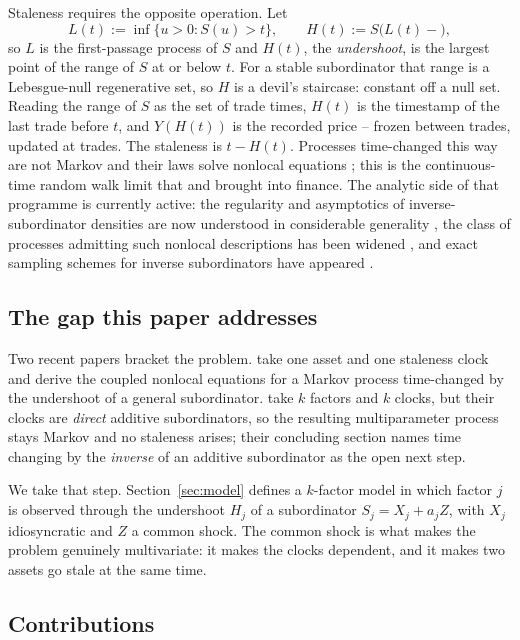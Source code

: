 \documentclass{ws-ijtaf}
\begin{document}
Staleness requires the opposite operation. Let
\begin{equation}
L(t) := \inf\{u>0 : S(u)>t\}, \qquad
H(t) := S\big(L(t)-\big),
\label{eq:LH}
\end{equation}
so $L$ is the first-passage process of $S$ and $H(t)$, the \emph{undershoot}, is
the largest point of the range of $S$ at or below $t$. For a stable subordinator
that range is a Lebesgue-null regenerative set, so $H$ is a devil's staircase:
constant off a null set. Reading the range of $S$ as the set of trade times,
$H(t)$ is the timestamp of the last trade before $t$, and $Y(H(t))$ is the
recorded price -- frozen between trades, updated at trades. The staleness is
$t-H(t)$. Processes time-changed this way are not Markov and their laws solve
nonlocal equations \citep{mee04,toa15,mee12}; this is the continuous-time random
walk limit that \citet{sca00} and \citet{mai00} brought into finance. The
analytic side of that programme is currently active: the regularity and
asymptotics of inverse-subordinator densities are now understood in
considerable generality \citep{asc24b}, the class of processes admitting such
nonlocal descriptions has been widened \citep{fac25}, and exact sampling
schemes for inverse subordinators have appeared \citep{bio26}.

\subsection{The gap this paper addresses}

Two recent papers bracket the problem. \citet{asc24} take one asset and one
staleness clock and derive the coupled nonlocal equations for a Markov process
time-changed by the undershoot of a general subordinator. \citet{don25} take $k$
factors and $k$ clocks, but their clocks are \emph{direct} additive
subordinators, so the resulting multiparameter process stays Markov and no
staleness arises; their concluding section names time changing by the
\emph{inverse} of an additive subordinator as the open next step.

We take that step. Section~\ref{sec:model} defines a $k$-factor model in which
factor $j$ is observed through the undershoot $H_j$ of a subordinator
$S_j = X_j + a_j Z$, with $X_j$ idiosyncratic and $Z$ a common shock. The common
shock is what makes the problem genuinely multivariate: it makes the clocks
dependent, and it makes two assets go stale at the same time.

\subsection{Contributions}
\end{document}
